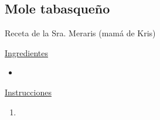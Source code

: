 \subsection{Mole tabasqueño}

Receta de la Sra. Meraris (mamá de Kris)









\underline{Ingredientes}
\begin{itemize}
\item 
\end{itemize}

\underline{Instrucciones}
\begin{enumerate}
\item 
\end{enumerate}